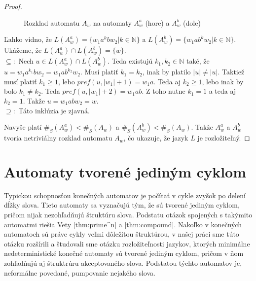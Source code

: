 \begin{proof}
\begin{figure}[H]
\caption{Rozklad automatu $ A_w $ na automaty $ A_w^a $ (hore) a $ A_w^b $ (dole)}
\end{figure}

Ľahko vidno, že $ L(A_w^a) = \lbrace w_1a^kbw_2 | k \in \mathbb{N} \rbrace $ a $ L(A_w^b) = \lbrace w_1ab^kw_2 | k \in \mathbb{N} \rbrace$. Ukážeme, že $ L(A_w^a) \cap L(A_w^b) = \lbrace w \rbrace $. \\ 
$ \subseteq: $ Nech $ u \in L(A_w^a) \cap L(A_w^b)  $. Teda existujú $ k_1,k_2 \in \mathbb{N} $ také, že $ u = w_1a^{k_1}bw_2 = w_1ab^{k_2}w_2 $. Musí platiť $ k_1 = k_2 $, inak by platilo $ |u| \neq |u| $. Taktiež musí platiť $ k_1 \geq 1 $, lebo $ pref(u,|w_1|+1) = w_1a $. Teda aj $ k_2 \geq 1 $, lebo inak by bolo $ k_1 \neq k_2 $. Teda $ pref(u,|w_1|+2) = w_1ab $. Z toho nutne $ k_1 = 1 $ a teda aj $ k_2 = 1 $. Takže $ u = w_1abw_2 = w $. \\
$ \supseteq: $ Táto inklúzia je zjavná.
\par
Navyše platí $ \#_S(A_w^a) < \#_S(A_w) $ a $ \#_S(A_w^b) < \#_S(A_w) $. Takže $ A_w^a $ a $ A_w^b $ tvoria netriviálny rozklad automatu $ A_w $, čo ukazuje, že jazyk $ L $ je rozložiteľný.
\end{proof}

\section{Automaty tvorené jediným cyklom}

Typickou schopnosťou konečných automatov je počítať v cykle zvyšok po delení dĺžky slova. Tieto automaty sa vyznačujú tým, že sú tvorené jediným cyklom, pričom nijak nezohľadňujú štruktúru slova. Podstatu otázok spojených s takýmito automatmi riešia Vety \ref{thm:prime^n} a \ref{thm:compound}. Nakoľko v konečných automatoch sú práve cykly veľmi dôležitou štruktúrou, v našej práci sme túto otázku rozšírili a študovali sme otázku rozložiteľnosti jazykov, ktorých minimálne nedeterministické konečné automaty sú tvorené jediným cyklom, pričom v ňom zohľadňujú aj štruktrúru akceptovaného slova. Podstatou týchto automatov je, neformálne povedané, pumpovanie nejakého slova.

